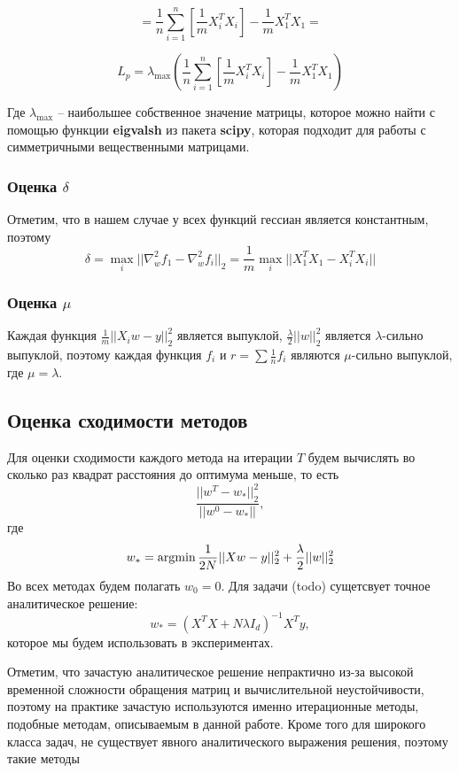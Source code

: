 \documentclass[a4paper,12pt]{extarticle}
\newcommand{\argmin}{\mathop{\rm argmin}}
\begin{document}
    \[=\frac{1}{n}\sum_{i = 1}^{n} [\frac{1}{m}X_i^T X_i]- \frac{1}{m} X_1^T X_1 = \]

    \[L_p = \lambda_{\max}(\frac{1}{n}\sum_{i = 1}^{n} [\frac{1}{m}X_i^T X_i]- \frac{1}{m} X_1^T X_1) \]

    Где $\lambda_{\max}$ -- наибольшее собственное значение матрицы,
    которое можно найти с помощью функции \textbf{eigvalsh} из пакета \textbf{scipy},
    которая подходит для работы с симметричными вещественными матрицами. 
     

    
    \subsubsection{Оценка $\delta$}
    Отметим, что в нашем случае у всех функций гессиан является константным, поэтому 
    \[\delta = \max_{i} ||\nabla_{w}^2 f_1 - \nabla_{w}^2 f_i||_2 = \frac{1}{m} \max_{i} ||X_1^T X_1 - X_i^T X_i||\]
    
    \subsubsection{Оценка $\mu$}
    Каждая функция $\frac{1}{m}||X_iw - y||_2^2$ является выпуклой,
    $\frac{\lambda}{2} ||w||_2^2$ является $\lambda$-сильно выпуклой,
    поэтому  каждая функция $f_i$ и $r = \sum\frac{1}{n} f_i$ являются $\mu$-сильно выпуклой,
    где $\mu = \lambda$.

    \subsection{Оценка сходимости методов}
    Для оценки сходимости каждого метода на итерации $T$ будем вычислять во сколько раз квадрат расстояния до оптимума меньше,
    то есть 
    \[\frac{||w^T - w_*||_2^2}{||w^0 - w_*||},\]
    где 
    \[w_* = \argmin \frac{1}{2N}||Xw - y||_2^2 + \frac{\lambda}{2}||w||_2^2\]
    Во всех методах будем полагать $w_0 = 0$.
    Для задачи (todo) сущетсвует точное аналитическое решение:
    \[w_* = (X^T X + N\lambda I_d)^{-1}X^T y,\]
    которое мы будем использовать в экспериментах. 
    
    Отметим, что зачастую аналитическое решение непрактично из-за высокой временной сложности
    обращения матриц и вычислительной неустойчивости, поэтому на практике зачастую используются именно итерационные методы,
    подобные методам, описываемым в данной работе. Кроме того для широкого класса задач,
    не существует явного аналитического выражения решения, поэтому такие методы 
    
\newpage 
\printbibliography[heading=bibintoc] 
	
\end{document}
